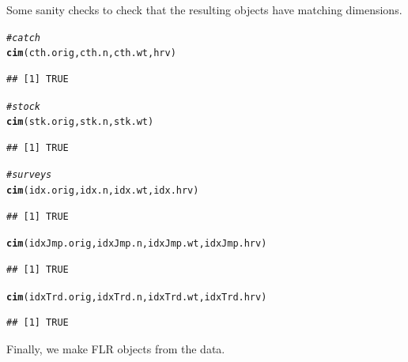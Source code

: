 \documentclass[a4paper,english,10pt]{article}\usepackage[]{graphicx}\usepackage[]{color}
\makeatletter
\newcommand{\hlcom}[1]{\textcolor[rgb]{0.678,0.584,0.686}{\textit{#1}}}%
\newcommand{\hlstd}[1]{\textcolor[rgb]{0.345,0.345,0.345}{#1}}%
\newcommand{\hlkwd}[1]{\textcolor[rgb]{0.737,0.353,0.396}{\textbf{#1}}}%
\newenvironment{kframe}{%
 \def\at@end@of@kframe{}%
 \ifinner\ifhmode%
  \def\at@end@of@kframe{\end{minipage}}%
  \begin{minipage}{\columnwidth}%
 \fi\fi%
 \def\FrameCommand##1{\hskip\@totalleftmargin \hskip-\fboxsep
 \colorbox{shadecolor}{##1}\hskip-\fboxsep
     \hskip-\linewidth \hskip-\@totalleftmargin \hskip\columnwidth}%
 \MakeFramed {\advance\hsize-\width
   \@totalleftmargin\z@ \linewidth\hsize
   \@setminipage}}%
 {\par\unskip\endMakeFramed%
 \at@end@of@kframe}
\newenvironment{knitrout}{}{} %
\makeatother
\begin{document}
Some sanity checks to check that the resulting objects have matching dimensions.

\begin{knitrout}
\color{fgcolor}\begin{kframe}
\begin{alltt}
\hlcom{# catch}
\hlkwd{cim}\hlstd{(cth.orig, cth.n, cth.wt, hrv)}
\end{alltt}
\begin{verbatim}
## [1] TRUE
\end{verbatim}
\begin{alltt}
\hlcom{# stock}
\hlkwd{cim}\hlstd{(stk.orig, stk.n, stk.wt)}
\end{alltt}
\begin{verbatim}
## [1] TRUE
\end{verbatim}
\begin{alltt}
\hlcom{# surveys}
\hlkwd{cim}\hlstd{(idx.orig, idx.n, idx.wt, idx.hrv)}
\end{alltt}
\begin{verbatim}
## [1] TRUE
\end{verbatim}
\begin{alltt}
\hlkwd{cim}\hlstd{(idxJmp.orig, idxJmp.n, idxJmp.wt, idxJmp.hrv)}
\end{alltt}
\begin{verbatim}
## [1] TRUE
\end{verbatim}
\begin{alltt}
\hlkwd{cim}\hlstd{(idxTrd.orig, idxTrd.n, idxTrd.wt, idxTrd.hrv)}
\end{alltt}
\begin{verbatim}
## [1] TRUE
\end{verbatim}
\end{kframe}
\end{knitrout}





Finally, we make FLR objects from the data.
\end{document}
